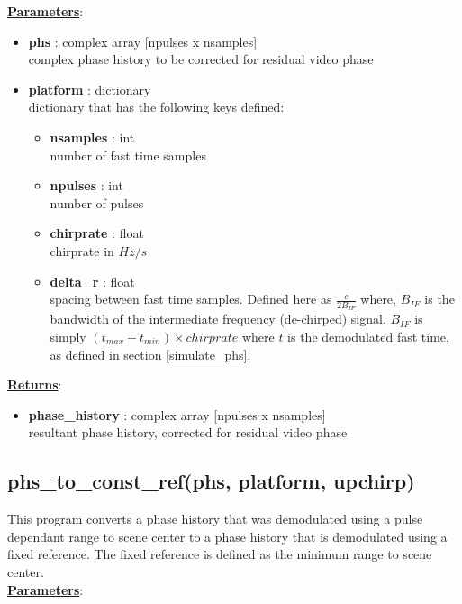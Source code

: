 \documentclass{article}
\newcommand{\defs}[2]{\textbf{{#1}} : {#2}}
\begin{document}
\noindent \underline{\textbf{Parameters}}:

\begin{itemize}
	\item \defs{phs}{complex array [npulses x nsamples]}\\
  	complex phase history to be corrected for residual video phase
  	\item \defs{platform}{dictionary}\\
  	dictionary that has the following keys defined:
  \begin{itemize}
    \item \defs{nsamples}{int}\\
    	number of fast time samples
    \item \defs{npulses}{int}\\
    	number of pulses
    \item \defs{chirprate}{float}\\
    	chirprate in $Hz/s$
	\item \defs{delta\_r}{float}\\
	   	spacing between fast time samples.  Defined here as $\frac{c}{2B_{IF}}$ where, $B_{IF}$ is the bandwidth of the intermediate frequency (de-chirped) signal.  $B_{IF}$ is simply $(t_{max}-t_{min})\times chirprate$ where $t$ is the demodulated fast time, as defined in section \ref{simulate_phs}.
  \end{itemize}
\end{itemize}

\noindent \underline{\textbf{Returns}}:
\begin{itemize}
	\item \defs{phase\_history}{complex array [npulses x nsamples]}\\
	resultant phase history, corrected for residual video phase
\end{itemize}

\newpage

\subsection{phs\_to\_const\_ref(phs, platform, upchirp)}
This program converts a phase history that was demodulated using a pulse dependant range to scene center to a phase history that is demodulated using a fixed reference.  The fixed reference is defined as the minimum range to scene center.\\

\noindent \underline{\textbf{Parameters}}:
\end{document}
